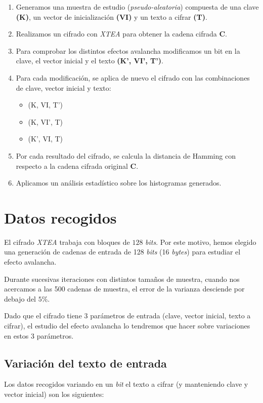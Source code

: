 \documentclass[11pt,a4paper]{article}
\begin{document}
\begin{enumerate}
\item Generamos una muestra de estudio (\emph{pseudo-aleatoria}) compuesta de una clave
  \textbf{(K)}, un vector de inicialización \textbf{(VI)} y un texto a
  cifrar \textbf{(T)}.
\item Realizamos un cifrado con \emph{XTEA} para obtener la cadena
  cifrada \textbf{C}.
\item Para comprobar los distintos efectos avalancha modificamos un
  bit en la clave, el vector inicial y el texto \textbf{(K', VI',
    T')}.
\item Para cada modificación, se aplica de nuevo el cifrado con las
  combinaciones de clave, vector inicial y texto:
  \begin{itemize}
  \item (K, VI, T')
  \item (K, VI', T)   
  \item (K', VI, T)
  \end{itemize}
\item Por cada resultado del cifrado, se calcula la distancia de
  Hamming con respecto a la cadena cifrada original \textbf{C}.
\item Aplicamos un análisis estadístico sobre los histogramas generados.
\end{enumerate}

\section{Datos recogidos}

El cifrado \emph{XTEA} trabaja con bloques de $128$ \emph{bits}. Por
este motivo, hemos elegido una generación de cadenas de entrada de 128
\emph{bits} (16 \emph{bytes}) para estudiar el efecto avalancha.

Durante sucesivas iteraciones con distintos tamaños de muestra, cuando
nos acercamos a las 500 cadenas de muestra, el error de la varianza
desciende por debajo del $5\%$.

Dado que el cifrado tiene 3 parámetros de entrada (clave, vector
inicial, texto a cifrar), el estudio del efecto avalancha lo tendremos
que hacer sobre variaciones en estos 3 parámetros.

\subsection{Variación del texto de entrada}

Los datos recogidos variando en un \emph{bit} el texto a cifrar (y manteniendo clave y vector inicial) son los siguientes:
\end{document}
